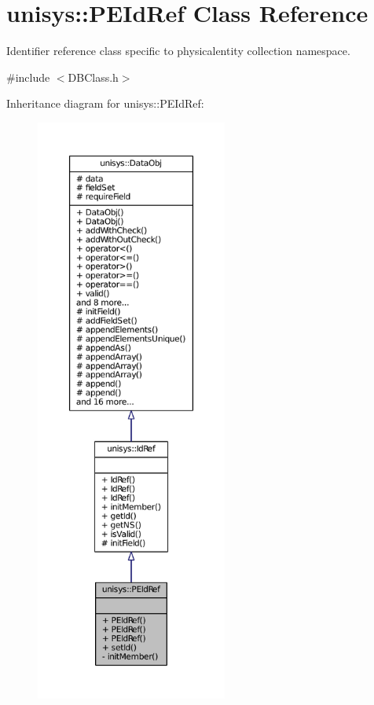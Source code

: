 \hypertarget{classunisys_1_1PEIdRef}{\section{unisys\-:\-:P\-E\-Id\-Ref Class Reference}
\label{classunisys_1_1PEIdRef}
}


Identifier reference class specific to physicalentity collection namespace.  




{\ttfamily \#include $<$D\-B\-Class.\-h$>$}



Inheritance diagram for unisys\-:\-:P\-E\-Id\-Ref\-:
\nopagebreak
\begin{figure}[H]
\begin{center}
\leavevmode
\includegraphics[height=550pt]{classunisys_1_1PEIdRef__inherit__graph}
\end{center}
\end{figure}


